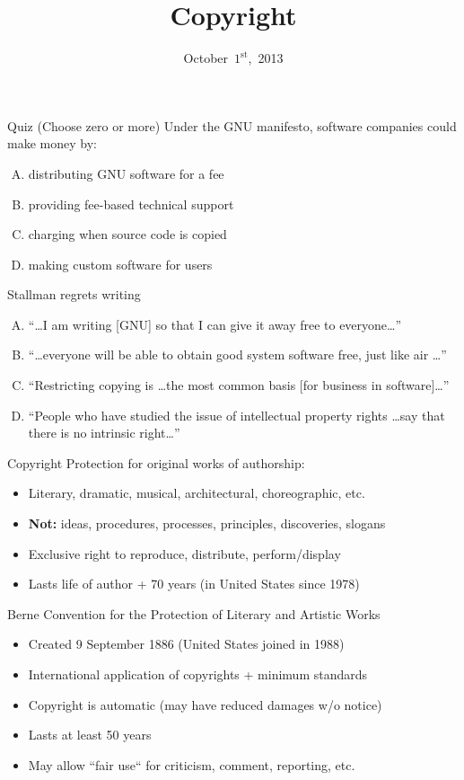 \documentclass{beamer}
\title{Copyright}
\date{October~$1^{\text{st}}$,~2013}
\begin{document}
\begin{frame}
\titlepage
\end{frame}

\begin{frame}{Quiz \hfill (Choose zero or more)}
Under the GNU manifesto, software companies could make money by:
\begin{enumerate}[(A)]
\item<1-2> distributing GNU software for a fee
\item<1-2> providing fee-based technical support
\item<1> charging when source code is copied
\item<1-2> making custom software for users
\end{enumerate}
\medskip
Stallman regrets writing
\begin{enumerate}[(A)]
\item<1-2> ``\ldots I am writing [GNU] so that I can give it away free to everyone\ldots''
\item<1-2> ``\ldots everyone will be able to obtain good system software free, just like air \ldots''
\item<1-2> ``Restricting copying is \ldots the most common basis [for business in software]\ldots''
\item<1-2> ``People who have studied the issue of intellectual property rights \ldots say that there is no intrinsic right\ldots''
\end{enumerate}
\end{frame}

\begin{frame}{Copyright}
Protection for original works of authorship:
\begin{itemize}
\item Literary, dramatic, musical, architectural, choreographic, etc.
\item \textbf{Not:} ideas, procedures, processes, principles, discoveries, slogans
\item Exclusive right to reproduce, distribute, perform/display
\item Lasts life of author + 70 years (in United States since 1978)
\end{itemize}
\bigskip
Berne Convention for the Protection of Literary and Artistic Works
\begin{itemize}
\item Created 9 September 1886 (United States joined in 1988)
\item International application of copyrights + minimum standards 
\item Copyright is automatic (may have reduced damages w/o notice)
\item Lasts at least 50 years
\item May allow ``fair use`` for criticism, comment, reporting, etc.
\end{itemize}
\end{frame}
\end{document}
